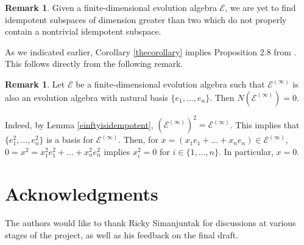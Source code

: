 \documentclass[11pt]{article}
\theoremstyle{definition}
\newtheorem{rem}[thm]{Remark}
\numberwithin{equation}{section}
\begin{document}
\begin{humanblock}


\begin{rem} Given a finite-dimensional evolution algebra $\mathcal E$, we are yet to find idempotent subspaces of dimension greater than two which do not properly contain a nontrivial idempotent subspace.
\end{rem}

As we indicated earlier, Corollary \ref{thecorollary} implies Proposition 2.8 from \cite{HW}. This follows directly from the following remark.

\begin{rem}\label{implicationremark}
    Let $\mathcal E$ be a finite-dimensional evolution algebra such that $\mathcal E^{(\infty)}$ is also an evolution algebra with natural basis $\{e_1,\ldots, e_n\}$. Then $N (\mathcal E^{(\infty)}) = 0$.

    Indeed, by Lemma \ref{einftyisidempotent}, $\left(\mathcal E^{(\infty)}\right)^2 = \mathcal E^{(\infty)}$. This implies that $\{e_1^2,\ldots, e_n^2\}$ is a basis for $\mathcal E^{(\infty)}$. Then, for $x = (x_1e_1 + \ldots+x_n e_n) \in \mathcal E^{(\infty)}$, $0 = x^2 = x_1^2e_1^2 + \ldots +x_n^2 e_n^2$ implies $x_i^2 = 0$ for $i\in \{1,\ldots,n\}$. In particular, $x=0$.
\end{rem}


\end{humanblock}





\section*{Acknowledgments}

The authors would like to thank Ricky Simanjuntak for discussions at various stages of the project, as well as his feedback on the final draft.






% 
\end{document}

